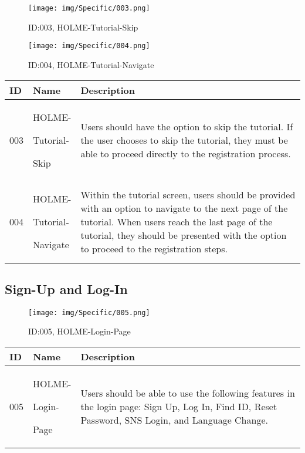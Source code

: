 \documentclass[conference]{IEEEtran}
\begin{document}
\begin{enumerate}
\vspace{1cm}

\begin{figure}[h]
\centering
\texttt{[image: img/Specific/003.png]}
\caption{ID:003, HOLME-Tutorial-Skip}
\vspace{0.5cm}
\texttt{[image: img/Specific/004.png]}
\caption{ID:004, HOLME-Tutorial-Navigate}
\end{figure}

\begin{table}[h]
\def\arraystretch{1.2} \small
    \begin{tabular}{|p{1cm}|p{1.8cm}|p{5.0cm}|}
        \hline
        ID & Name & Description\\ \hline
         003 \par  & HOLME-\par Tutorial-\par Skip &Users should have the option to skip the tutorial. If the user chooses to skip the tutorial, they must be able to proceed directly to the registration process.\\ \hline
         004 \par  & HOLME-\par Tutorial-\par Navigate &Within the tutorial screen, users should be provided with an option to navigate to the next page of the tutorial. When users reach the last page of the tutorial, they should be presented with the option to proceed to the registration steps.\\ \hline
    \end{tabular}
\end{table}

\vspace{1cm}

\subsection{Sign-Up and Log-In}

\begin{figure}[h]
\centering
\texttt{[image: img/Specific/005.png]}
\caption{ID:005, HOLME-Login-Page}
\end{figure}

\begin{table}[h]
\def\arraystretch{1.2} \small
    \begin{tabular}{|p{1cm}|p{1.8cm}|p{5.0cm}|}
        \hline
        ID & Name & Description\\ \hline
         005 \par  & HOLME-\par Login-\par Page &Users should be able to use the following features in the login page: Sign Up, Log In, Find ID, Reset Password, SNS Login, and Language Change.\\ \hline
	\end{tabular}
\end{table}



\end{enumerate}
\end{document}
